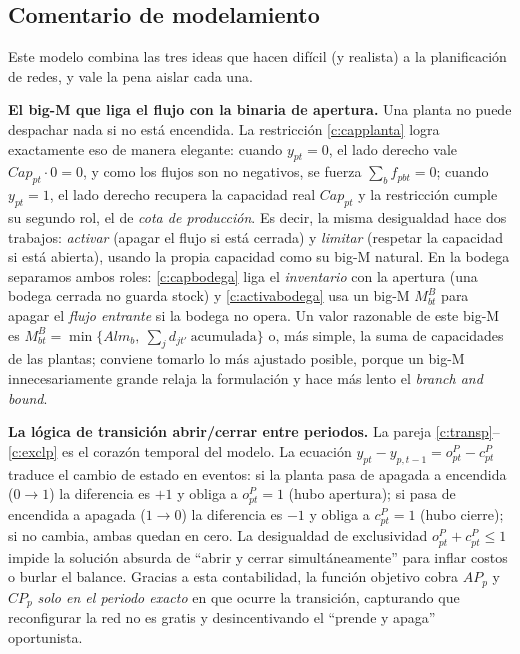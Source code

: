 \documentclass[11pt]{article}
\begin{document}
\subsection*{Comentario de modelamiento}

Este modelo combina las tres ideas que hacen difícil (y realista) a la planificación de redes, y vale la pena aislar cada una.

\textbf{El big-M que liga el flujo con la binaria de apertura.} Una planta no puede despachar nada si no está encendida. La restricción \eqref{c:capplanta} logra exactamente eso de manera elegante: cuando $y_{pt}=0$, el lado derecho vale $\mathit{Cap}_{pt}\cdot 0 = 0$, y como los flujos son no negativos, se fuerza $\sum_b f_{pbt}=0$; cuando $y_{pt}=1$, el lado derecho recupera la capacidad real $\mathit{Cap}_{pt}$ y la restricción cumple su segundo rol, el de \emph{cota de producción}. Es decir, la misma desigualdad hace dos trabajos: \emph{activar} (apagar el flujo si está cerrada) y \emph{limitar} (respetar la capacidad si está abierta), usando la propia capacidad como su big-M natural. En la bodega separamos ambos roles: \eqref{c:capbodega} liga el \emph{inventario} con la apertura (una bodega cerrada no guarda stock) y \eqref{c:activabodega} usa un big-M $M^{B}_{bt}$ para apagar el \emph{flujo entrante} si la bodega no opera. Un valor razonable de este big-M es $M^{B}_{bt}=\min\{\mathit{Alm}_b,\ \sum_j d_{jt'}\ \text{acumulada}\}$ o, más simple, la suma de capacidades de las plantas; conviene tomarlo lo más ajustado posible, porque un big-M innecesariamente grande relaja la formulación y hace más lento el \emph{branch and bound}.

\textbf{La lógica de transición abrir/cerrar entre periodos.} La pareja \eqref{c:transp}--\eqref{c:exclp} es el corazón temporal del modelo. La ecuación $y_{pt}-y_{p,t-1}=o^{P}_{pt}-c^{P}_{pt}$ traduce el cambio de estado en eventos: si la planta pasa de apagada a encendida ($0\to1$) la diferencia es $+1$ y obliga a $o^{P}_{pt}=1$ (hubo apertura); si pasa de encendida a apagada ($1\to0$) la diferencia es $-1$ y obliga a $c^{P}_{pt}=1$ (hubo cierre); si no cambia, ambas quedan en cero. La desigualdad de exclusividad $o^{P}_{pt}+c^{P}_{pt}\le 1$ impide la solución absurda de ``abrir y cerrar simultáneamente'' para inflar costos o burlar el balance. Gracias a esta contabilidad, la función objetivo cobra $\mathit{AP}_p$ y $\mathit{CP}_p$ \emph{solo en el periodo exacto} en que ocurre la transición, capturando que reconfigurar la red no es gratis y desincentivando el ``prende y apaga'' oportunista.
\end{document}
